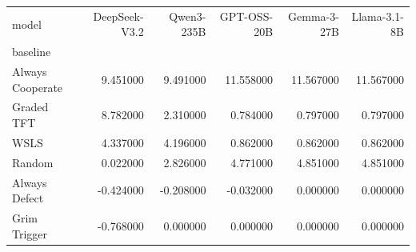 \begin{tabular}{lrrrrr}
\toprule
model & DeepSeek-V3.2 & Qwen3-235B & GPT-OSS-20B & Gemma-3-27B & Llama-3.1-8B \\
baseline &  &  &  &  &  \\
\midrule
Always Cooperate & 9.451000 & 9.491000 & 11.558000 & 11.567000 & 11.567000 \\
Graded TFT & 8.782000 & 2.310000 & 0.784000 & 0.797000 & 0.797000 \\
WSLS & 4.337000 & 4.196000 & 0.862000 & 0.862000 & 0.862000 \\
Random & 0.022000 & 2.826000 & 4.771000 & 4.851000 & 4.851000 \\
Always Defect & -0.424000 & -0.208000 & -0.032000 & 0.000000 & 0.000000 \\
Grim Trigger & -0.768000 & 0.000000 & 0.000000 & 0.000000 & 0.000000 \\
\bottomrule
\end{tabular}
